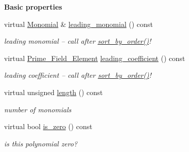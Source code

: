 \begin{Indent}\textbf{ Basic properties}\par
\begin{DoxyCompactItemize}
\item 
\mbox{\label{class_double___buffered___polynomial_aaa26be2d12a3bf9ad1a4957b11318a29}} 
virtual \hyperlink{class_monomial}{Monomial} \& \hyperlink{class_double___buffered___polynomial_aaa26be2d12a3bf9ad1a4957b11318a29}{leading\+\_\+monomial} () const
\begin{DoxyCompactList}\small\item\em leading monomial -- call after \hyperlink{class_double___buffered___polynomial_a0e7acad01d5ade31b60fe5453d48fdb5}{sort\+\_\+by\+\_\+order()}! \end{DoxyCompactList}\item 
\mbox{\label{class_double___buffered___polynomial_a6b5f88d2c15d479e993f5f958ae70b8e}} 
virtual \hyperlink{class_prime___field___element}{Prime\+\_\+\+Field\+\_\+\+Element} \hyperlink{class_double___buffered___polynomial_a6b5f88d2c15d479e993f5f958ae70b8e}{leading\+\_\+coefficient} () const
\begin{DoxyCompactList}\small\item\em leading coefficient -- call after \hyperlink{class_double___buffered___polynomial_a0e7acad01d5ade31b60fe5453d48fdb5}{sort\+\_\+by\+\_\+order()}! \end{DoxyCompactList}\item 
\mbox{\label{class_double___buffered___polynomial_a0d3de3a5b355331e0e61cb68f0a501a5}} 
virtual unsigned \hyperlink{class_double___buffered___polynomial_a0d3de3a5b355331e0e61cb68f0a501a5}{length} () const
\begin{DoxyCompactList}\small\item\em number of monomials \end{DoxyCompactList}\item 
\mbox{\label{class_double___buffered___polynomial_a1575f7de343e1c2644a6ca58db80e5d4}} 
virtual bool \hyperlink{class_double___buffered___polynomial_a1575f7de343e1c2644a6ca58db80e5d4}{is\+\_\+zero} () const
\begin{DoxyCompactList}\small\item\em is this polynomial zero? \end{DoxyCompactList}\item 

\end{DoxyCompactItemize}
\end{Indent}
